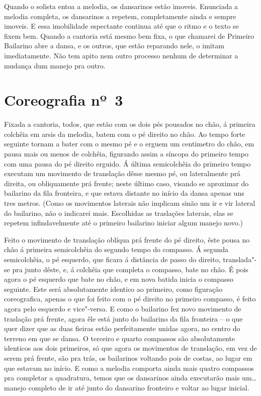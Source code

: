Quando o solista entoa a melodia, os dansarinos estão imoveis. Enunciada
a melodia completa, os dansarinos a repetem, completamente ainda e
sempre imoveis. E essa imobilidade espectante continua até que o ritmo e
o texto se fixem bem. Quando a cantoria está mesmo bem fixa, o que
chamarei de Primeiro Bailarino abre a dansa, e os outros, que estão
reparando nele, o imitam imediatamente. Não tem apito nem outro processo
nenhum de determinar a mudança dum manejo pra outro.

\section{Coreografia nº~3}

Fixada a cantoria, todos, que estão com os dois pés pousados no chão, á
primeira colchêia em arsis da melodia, batem com o pé direito no chão.
Ao tempo forte seguinte tornam a bater com o mesmo pé e o erguem um
centimetro do chão, em pausa mais ou menos de colchêia, figurando assim
a síncopa do primeiro tempo com uma pausa do pé direito erguido. Á
última semicolchêia do primeiro tempo executam um movimento de
translação dêsse mesmo pé, ou lateralmente prá direita, ou obliquamente
prá frente; neste último caso, visando se aproximar do bailarino da fila
fronteira, e que estava distante no início da dansa apenas uns tres
metros. (Como os movimentos laterais não implicam sinão um ir e vir
lateral do bailarino, não o indicarei mais. Escolhidas as traslações
laterais, elas se repetem infindavelmente até o primeiro bailarino
iniciar algum manejo novo.)

Feito o movimento de translação oblíqua prá frente do pé direito, êste
pousa no chão á primeira semicolchêia do segundo tempo do compasso. Á
segunda semicolchêia, o pé esquerdo, que ficara á distância de passo do
direito, translada"-se pra junto dêste, e, á colchêia que completa o
compasso, bate no chão. É pois agora o pé esquerdo que bate no chão, e
em nova batida inicia o compasso seguinte. Este será absolutamente
identico ao primeiro, como figuração coreografica, apenas o que foi
feito com o pé direito no primeiro compasso, é feito agora pelo esquerdo
e vice"-versa. E como o bailarino fez novo movimento de traslação prá
frente, agora êle está junto do bailarino da fila fronteira -- o que
quer dizer que as duas fieiras estão perfeitamente unidas agora, no
centro do terreno em que se dansa. O terceiro e quarto compassos são
absolutamente identicos aos dois primeiros, só que agora os movimentos
de translação, em vez de serem prá frente, são pra trás, os bailarinos
voltando pois de costas, ao lugar em que estavam no início. E como a
melodia comporta ainda mais quatro compassos pra completar a quadratura,
temos que os dansarinos ainda executarão mais um\ldots{} manejo completo de
ir até junto do dansarino fronteiro e voltar ao lugar inicial.

